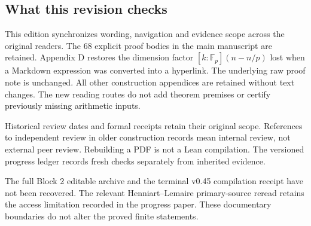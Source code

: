 \subsection*{What this revision checks}
This edition synchronizes wording, navigation and evidence scope across the original readers. The 68 explicit proof bodies in the main manuscript are retained. Appendix D restores the dimension factor \([k:\mathbb F_p](n-n/p)\) lost when a Markdown expression was converted into a hyperlink. The underlying raw proof note is unchanged. All other construction appendices are retained without text changes. The new reading routes do not add theorem premises or certify previously missing arithmetic inputs.

Historical review dates and formal receipts retain their original scope. References to independent review in older construction records mean internal review, not external peer review. Rebuilding a PDF is not a Lean compilation. The versioned progress ledger records fresh checks separately from inherited evidence.

The full Block 2 editable archive and the terminal v0.45 compilation receipt have not been recovered. The relevant Henniart--Lemaire primary-source reread retains the access limitation recorded in the progress paper. These documentary boundaries do not alter the proved finite statements.

\endgroup
